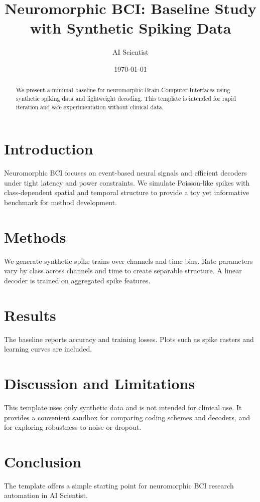 \documentclass{article}
\title{Neuromorphic BCI: Baseline Study with Synthetic Spiking Data}
\author{AI Scientist}
\date{\today}
\begin{document}
\maketitle

\begin{abstract}
We present a minimal baseline for neuromorphic Brain-Computer Interfaces using synthetic spiking data and lightweight decoding. This template is intended for rapid iteration and safe experimentation without clinical data.
\end{abstract}

\section{Introduction}
Neuromorphic BCI focuses on event-based neural signals and efficient decoders under tight latency and power constraints. We simulate Poisson-like spikes with class-dependent spatial and temporal structure to provide a toy yet informative benchmark for method development.

\section{Methods}
We generate synthetic spike trains over channels and time bins. Rate parameters vary by class across channels and time to create separable structure. A linear decoder is trained on aggregated spike features.

\section{Results}
The baseline reports accuracy and training losses. Plots such as spike rasters and learning curves are included.

\section{Discussion and Limitations}
This template uses only synthetic data and is not intended for clinical use. It provides a convenient sandbox for comparing coding schemes and decoders, and for exploring robustness to noise or dropout.

\section{Conclusion}
The template offers a simple starting point for neuromorphic BCI research automation in AI Scientist.



\end{document}
